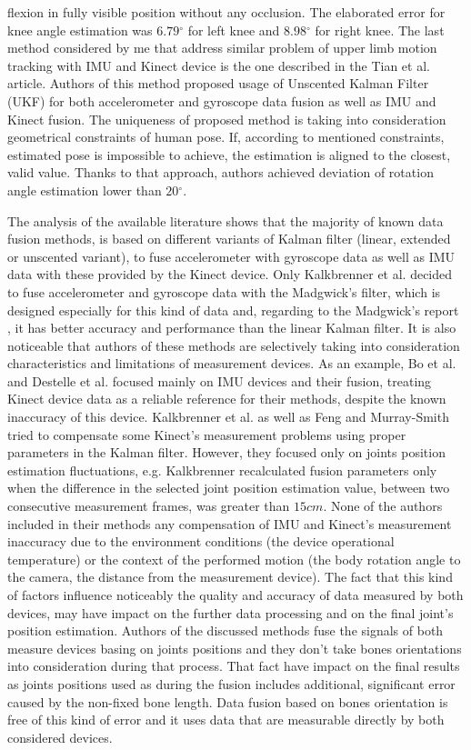 \documentclass[sensors,article,submit,moreauthors,pdftex,10pt,a4paper]{mdpi}
\newcommand{\degree}{\ensuremath{{}^{\circ}}\xspace}
\begin{document}
flexion in fully visible position without any occlusion. The elaborated error for knee angle estimation was $6.79\degree$ for left knee and $8.98\degree$ for right knee. The last method considered by me that address similar problem of upper limb motion tracking with IMU and Kinect device is the one described in the Tian et al. \cite{Tian2015a} article. Authors of this method proposed usage of Unscented Kalman Filter (UKF) for both accelerometer and gyroscope data fusion as well as IMU and Kinect fusion. The uniqueness of proposed method is taking into consideration geometrical constraints of human pose. If, according to mentioned constraints, estimated pose is impossible to achieve, the estimation is aligned to the closest, valid value. Thanks to that approach, authors achieved deviation of rotation angle estimation lower than $20\degree$.

The analysis of the available literature shows that the majority of known data fusion methods, is based on different variants of Kalman filter (linear, extended or unscented variant), to fuse accelerometer with gyroscope data as well as IMU data with these provided by the Kinect device. Only Kalkbrenner et al. decided to fuse accelerometer and gyroscope data with the Madgwick's filter, which is designed especially for this kind of data and, regarding to the Madgwick's report \cite{Madgwick2011}, it has better accuracy and performance than the linear Kalman filter. It is also noticeable that authors of these methods are selectively taking into consideration characteristics and limitations of measurement devices. As an example, Bo et al. \cite{Bo2011a} and Destelle et al. \cite{Destelle2014} focused mainly on IMU devices and their fusion, treating Kinect device data as a reliable reference for their methods, despite the known inaccuracy of this device. Kalkbrenner et al.\cite{Kalkbrenner2014} as well as Feng and Murray-Smith\cite{Murray-Smith2014} tried to compensate some Kinect's measurement problems using proper parameters in the Kalman filter. However, they focused only on joints position estimation fluctuations, e.g. Kalkbrenner recalculated fusion parameters only when the difference in the selected joint position estimation value, between two consecutive measurement frames, was greater than $15cm$. None of the authors included in their methods any compensation of IMU and Kinect's measurement inaccuracy due to the environment conditions (the device operational temperature) or the context of the performed motion (the body rotation angle to the camera, the distance from the measurement device). The fact that this kind of factors influence noticeably the quality and accuracy of data measured by both devices, may have impact on the further data processing and on the final joint's position estimation. Authors of the discussed methods fuse the signals of both measure devices basing on joints positions and they don't take bones orientations into consideration during that process. That fact have impact on the final results as joints positions used as during the fusion includes additional, significant error caused by the non-fixed bone length. Data fusion based on bones orientation is free of this kind of error and it uses data that are measurable directly by both considered devices.
\end{document}
